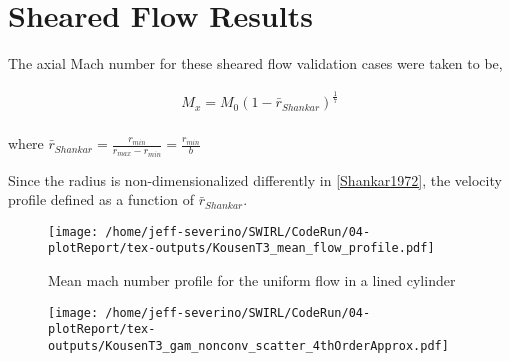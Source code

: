 \section{Sheared Flow Results}

The axial Mach number for these sheared flow validation cases were taken to be,

\begin{align}
    M_x = M_0 \left( 1 - \bar{r}_{Shankar} \right)^{ \frac{1}{7}}
    \label{eqn:cylindricalShear} \\
\end{align}

where $\bar{r}_{Shankar} = \frac{r_{min}}{r_{max}-r_{min}} = \frac{r_{min}}{b}$ 

Since the radius is non-dimensionalized differently in \ref{Shankar1972}, the 
velocity profile defined as a function of $\bar{r}_{Shankar}$.

\begin{figure}[h!]
    \centering
    \texttt{[image: /home/jeff-severino/SWIRL/CodeRun/04-plotReport/tex-outputs/KousenT3\_mean\_flow\_profile.pdf]}
    \caption{Mean mach number profile for the uniform flow in a lined cylinder}
    \label{fig:1}
\end{figure}

\begin{figure}[h!]
    \centering
    \texttt{[image: /home/jeff-severino/SWIRL/CodeRun/04-plotReport/tex-outputs/KousenT3\_gam\_nonconv\_scatter\_4thOrderApprox.pdf]}
\end{figure}


